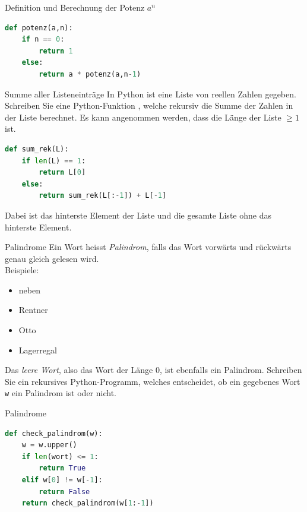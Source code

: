 \begin{frame}[fragile]{Definition und Berechnung der Potenz $a^n$}
\begin{lstlisting}[language=Python]
def potenz(a,n):
    if n == 0:
        return 1
    else:
        return a * potenz(a,n-1)
\end{lstlisting}
\end{frame}


\begin{frame}[fragile]{Summe aller Listeneinträge}
In Python ist eine Liste  von reellen Zahlen gegeben. Schreiben Sie eine Python-Funktion , welche rekursiv die Summe der Zahlen in der Liste berechnet. Es kann angenommen werden, dass die Länge der Liste $\geq 1$ ist.
\begin{lstlisting}[language=Python]
def sum_rek(L):
    if len(L) == 1:
        return L[0]
    else:
        return sum_rek(L[:-1]) + L[-1]
\end{lstlisting}
Dabei ist  das hinterste Element der Liste und  die gesamte Liste ohne das hinterste Element.
\end{frame}



\begin{frame}[fragile]{Palindrome}
Ein Wort heisst \textit{Palindrom}, falls das Wort vorwärts und rückwärts genau gleich gelesen wird.\\
Beispiele:
\begin{itemize}
    \item neben
    \item Rentner
    \item Otto
    \item Lagerregal
\end{itemize}
Das \textit{leere Wort}, also das Wort der Länge $0$, ist ebenfalls ein Palindrom. Schreiben Sie ein rekursives Python-Programm, welches entscheidet, ob ein gegebenes Wort \verb|w| ein Palindrom ist oder nicht.
\end{frame}


\begin{frame}[fragile]{Palindrome}
\begin{lstlisting}[language=Python]
def check_palindrom(w):
    w = w.upper()
    if len(wort) <= 1:
        return True
    elif w[0] != w[-1]:
        return False
    return check_palindrom(w[1:-1])
\end{lstlisting}
\end{frame}

